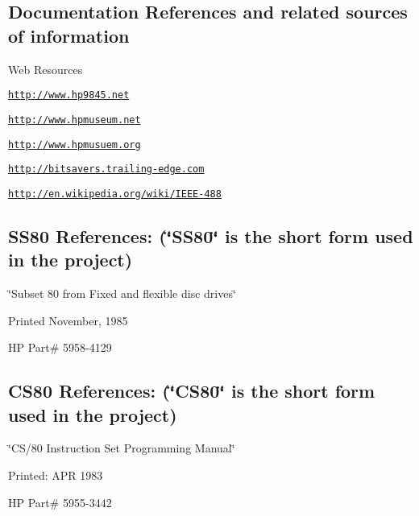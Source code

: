 \subsection*{Documentation References and related sources of information}


\begin{DoxyItemize}
\item Web Resources
\begin{DoxyItemize}
\item \href{http://www.hp9845.net}{\tt http\-://www.\-hp9845.\-net}
\item \href{http://www.hpmuseum.net}{\tt http\-://www.\-hpmuseum.\-net}
\item \href{http://www.hpmusuem.org}{\tt http\-://www.\-hpmusuem.\-org}
\item \href{http://bitsavers.trailing-edge.com}{\tt http\-://bitsavers.\-trailing-\/edge.\-com}
\item \href{http://en.wikipedia.org/wiki/IEEE-488}{\tt http\-://en.\-wikipedia.\-org/wiki/\-I\-E\-E\-E-\/488}
\end{DoxyItemize}
\end{DoxyItemize}

\subsection*{S\-S80 References\-: (\char`\"{}\-S\-S80\char`\"{} is the short form used in the project)}


\begin{DoxyItemize}
\item \char`\"{}\-Subset 80 from Fixed and flexible disc drives\char`\"{}
\item Printed November, 1985
\item H\-P Part\# 5958-\/4129
\end{DoxyItemize}

\subsection*{C\-S80 References\-: (\char`\"{}\-C\-S80\char`\"{} is the short form used in the project)}


\begin{DoxyItemize}
\item \char`\"{}\-C\-S/80 Instruction Set Programming Manual\char`\"{}
\item Printed\-: A\-P\-R 1983
\item H\-P Part\# 5955-\/3442
\end{DoxyItemize}

